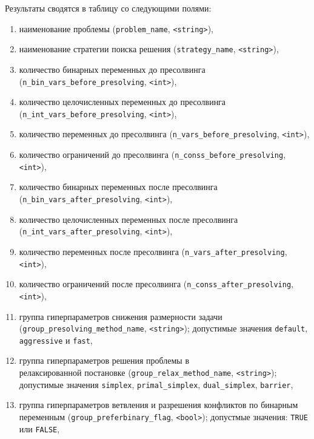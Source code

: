 \documentclass[%
	11pt,
	a4paper,
	utf8,
		]{article}
\begin{document}
Результаты сводятся в таблицу со следующими полями:
\begin{enumerate}
	\item наименование проблемы (\verb|problem_name|, \verb|<string>|),
	
	\item наименование стратегии поиска решения (\verb|strategy_name|, \verb|<string>|),
	
	\item количество бинарных переменных до пресолвинга (\verb|n_bin_vars_before_presolving|, \verb|<int>|),
	
	\item количество целочисленных переменных до пресолвинга (\verb|n_int_vars_before_presolving|, \verb|<int>|),
	
	\item количество переменных до пресолвинга (\verb|n_vars_before_presolving|, \verb|<int>|),
	
	\item количество ограничений до пресолвинга (\verb|n_conss_before_presolving|, \verb|<int>|),
	
	\item количество бинарных переменных после пресолвинга (\verb|n_bin_vars_after_presolving|, \verb|<int>|),
	
	\item количество целочисленных переменных после пресолвинга (\verb|n_int_vars_after_presolving|, \verb|<int>|),
	
	\item количество переменных после пресолвинга (\verb|n_vars_after_presolving|, \verb|<int>|),
	
	\item количество ограничений после пресолвинга (\verb|n_conss_after_presolving|, \verb|<int>|),
	
	\item группа гиперпараметров снижения размерности задачи (\verb|group_presolving_method_name|, \verb|<string>|); допустимые значения \verb|default|, \verb|aggressive| и \verb|fast|,
	
	\item группа гиперпараметров решения проблемы в \\релаксированной постановке (\verb|group_relax_method_name|, \verb|<string>|); допустимые значения \verb|simplex|, \verb|primal_simplex|, \verb|dual_simplex|, \verb|barrier|,
	
	\item группа гиперпараметров ветвления и разрешения конфликтов по бинарным переменным (\verb|group_preferbinary_flag|, \verb|<bool>|); допустмые значения: \verb|TRUE| или \verb|FALSE|,
	

\end{enumerate}
\end{document}
